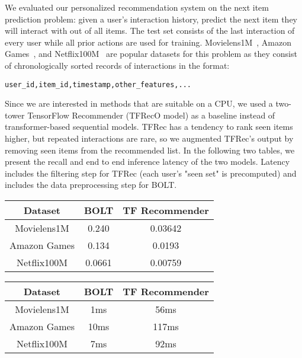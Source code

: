 \documentclass[sigconf]{acmart}
\begin{document}
We evaluated our personalized recommendation system on the next item prediction problem: given a user's interaction history, predict the next item they will interact with out of all items. The test set consists of the last interaction of every user while all prior actions are used for training. Movielens1M~\cite{harper2015movielens}, Amazon Games~\cite{chin2018anr}, and Netflix100M~\cite{cremonesi2010performance} are popular datasets for this problem as they consist of chronologically sorted records of interactions in the format:

\begin{verbatim}
user_id,item_id,timestamp,other_features,...
\end{verbatim}

Since we are interested in methods that are suitable on a CPU, we used a two-tower TensorFlow Recommender (TFRecO model) as a baseline instead of transformer-based sequential models. TFRec has a tendency to rank seen items higher, but repeated interactions are rare, so we augmented TFRec's output by removing seen items from the recommended list. In the following two tables, we present the recall and end to end inference latency of the two models. Latency includes the filtering step for TFRec (each user's "seen set" is precomputed) and includes the data preprocessing step for BOLT.




\begin{table}[h]
\begin{tabular}{|c|c|c|}
 \hline
 Dataset & BOLT & TF Recommender \\ \hline
 Movielens1M & 0.240 & 0.03642\\ \hline
 Amazon Games & 0.134 & 0.0193\\ \hline
 Netflix100M & 0.0661 & 0.00759\\ \hline
\end{tabular}
\label{personalization-acc}
\vspace{-1.1cm}
\end{table}
\begin{table}[h]
\begin{tabular}{|c|c|c|}
 \hline
 Dataset & BOLT & TF Recommender \\ \hline
 Movielens1M & 1ms & 56ms\\ \hline
 Amazon Games & 10ms & 117ms\\ \hline
 Netflix100M & 7ms & 92ms\\ \hline
\end{tabular}
\label{personalization-inf}
\vspace{-0.5cm}
\end{table}
\end{document}
